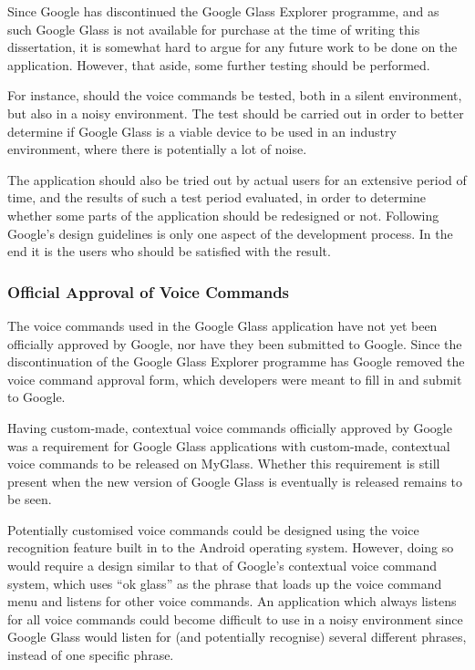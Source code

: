 Since Google has discontinued the Google Glass Explorer programme, and as such Google Glass is not available for purchase at the time of writing this dissertation, it is somewhat hard to argue for any future work to be done on the application. However, that aside, some further testing should be performed.

For instance, should the voice commands be tested, both in a silent environment, but also in a noisy environment. The test should be carried out in order to better determine if Google Glass is a viable device to be used in an industry environment, where there is potentially a lot of noise. 

The application should also be tried out by actual users for an extensive period of time, and the results of such a test period evaluated, in order to determine whether some parts of the application should be redesigned or not. Following Google's design guidelines is only one aspect of the development process. In the end it is the users who should be satisfied with the result.

\subsubsection{Official Approval of Voice Commands}
The voice commands used in the Google Glass application have not yet been officially approved by Google, nor have they been submitted to Google. Since the discontinuation of the Google Glass Explorer programme has Google removed the voice command approval form, which developers were meant to fill in and submit to Google.

Having custom-made, contextual voice commands officially approved by Google was a requirement for Google Glass applications with custom-made, contextual voice commands to be released on MyGlass. Whether this requirement is still present when the new version of Google Glass is eventually is released remains to be seen.

Potentially customised voice commands could be designed using the voice recognition feature built in to the Android operating system. However, doing so would require a design similar to that of Google's contextual voice command system, which uses ``ok glass'' as the phrase that loads up the voice command menu and listens for other voice commands. An application which always listens for all voice commands could become difficult to use in a noisy environment since Google Glass would listen for (and potentially recognise) several different phrases, instead of one specific phrase.

